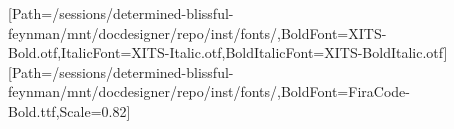 \usepackage{fontspec}
\usepackage{anyfontsize}
\setmainfont{XITS-Regular.otf}[Path=/sessions/determined-blissful-feynman/mnt/docdesigner/repo/inst/fonts/,BoldFont=XITS-Bold.otf,ItalicFont=XITS-Italic.otf,BoldItalicFont=XITS-BoldItalic.otf]
\setmonofont{FiraCode-Regular.ttf}[Path=/sessions/determined-blissful-feynman/mnt/docdesigner/repo/inst/fonts/,BoldFont=FiraCode-Bold.ttf,Scale=0.82]
\usepackage{xcolor}
\color{text}
\usepackage[explicit]{titlesec}
\titlespacing*{\section}{0pt}{1.7em}{0.5em}
\titlespacing*{\subsection}{0pt}{1.1em}{0.3em}
\titlespacing*{\subsubsection}{0pt}{0.9em}{0.2em}
\usepackage{titling}
\pretitle{\begin{flushleft}\fontsize{28.6}{31.5}\selectfont\bfseries\color{accent}}
\posttitle{\par\end{flushleft}\vskip0.4em}
\preauthor{\begin{flushleft}\large\color{muted}}
\postauthor{\end{flushleft}}
\predate{\begin{flushleft}\color{muted}}
\postdate{\end{flushleft}}
\usepackage{microtype}
\usepackage{booktabs}
\renewcommand{\arraystretch}{1.2}
\setlength{\parindent}{0pt}
\setlength{\parskip}{0.5em}
\linespread{1.3}
\usepackage{fancyhdr}\pagestyle{fancy}\fancyhf{}
\renewcommand{\headrulewidth}{0pt}\renewcommand{\footrulewidth}{0.4pt}
\fancyfoot[R]{\small\color{muted}\thepage}